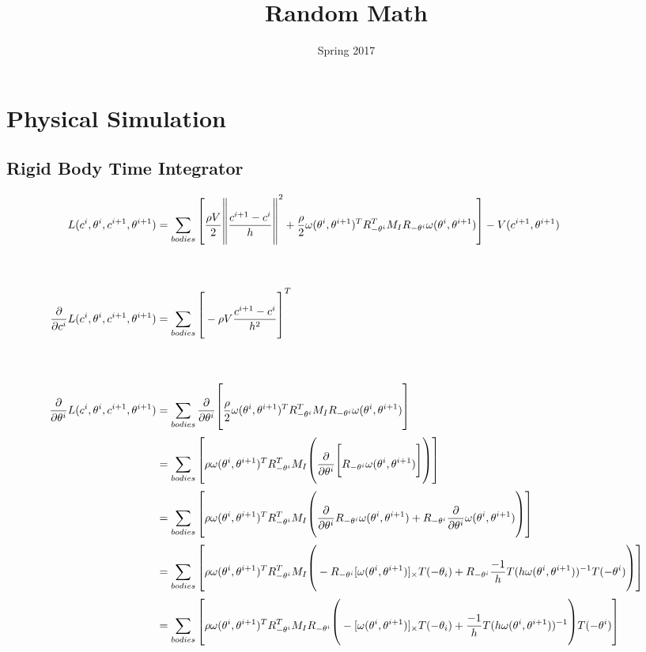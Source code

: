 \documentclass[landscape]{article}
\title{Random Math}
\date{Spring 2017}
\theoremstyle{definition}
\begin{document}
\section{Physical Simulation}

\subsection{Rigid Body Time Integrator}

\begin{align*}
    L(c^i, \theta^i, c^{i+1}, \theta^{i+1})
        &= \Huge\sum_{bodies} \Big[ \frac{\rho V}{2} \Big\|\frac{c^{i+1} - c^i}{h} \Big\|^2 + \frac{\rho}{2} \omega(\theta^i, \theta^{i+1})^T R_{-\theta^i}^T M_I R_{-\theta^i} \omega(\theta^i, \theta^{i+1}) \Big] - V(c^{i+1}, \theta^{i+1}) \\ \\
    \frac{\partial}{\partial c^i} L(c^i, \theta^i, c^{i+1}, \theta^{i+1}) 
        &= \Huge\sum_{bodies} \Big[ -\rho V \frac{c^{i+1} - c^i}{h^2} \Big]^T \\ \\
    \frac{\partial}{\partial \theta^i} L(c^i, \theta^i, c^{i+1}, \theta^{i+1}) 
        &= \Huge\sum_{bodies} \frac{\partial}{\partial \theta^i} \Big[ \frac{\rho}{2} \omega(\theta^i, \theta^{i+1})^T R_{-\theta^i}^T M_I R_{-\theta^i} \omega(\theta^i, \theta^{i+1}) \Big] \\
        &= \Huge\sum_{bodies} \Big[ \rho \omega(\theta^i, \theta^{i+1})^T R_{-\theta^i}^T M_I \Big( \frac{\partial}{\partial \theta^i} \big[ R_{-\theta^i} \omega(\theta^i, \theta^{i+1}) \big] \Big) \Big] \\
        &= \Huge\sum_{bodies} \Big[ \rho \omega(\theta^i, \theta^{i+1})^T R_{-\theta^i}^T M_I \Big( \frac{\partial}{\partial \theta^i} R_{-\theta^i} \omega(\theta^i, \theta^{i+1}) + R_{-\theta^i} \frac{\partial}{\partial \theta^i} \omega(\theta^i, \theta^{i+1}) \Big) \Big] \\
        &= \Huge\sum_{bodies} \Big[ \rho \omega(\theta^i, \theta^{i+1})^T R_{-\theta^i}^T M_I \Big( -R_{-\theta^i} [\omega(\theta^i, \theta^{i+1})]_{\times} T(-\theta_i) + R_{-\theta^i} \frac{-1}{h} T(h \omega(\theta^i, \theta^{i+1}))^{-1} T(-\theta^i) \Big) \Big] \\
        &= \Huge\sum_{bodies} \Big[ \rho \omega(\theta^i, \theta^{i+1})^T R_{-\theta^i}^T M_I R_{-\theta^i} \Big(- [\omega(\theta^i, \theta^{i+1})]_{\times} T(-\theta_i) + \frac{-1}{h} T(h \omega(\theta^i, \theta^{i+1}))^{-1} \Big) T(-\theta^i) \Big] \\ \\

\end{align*}
\end{document}
